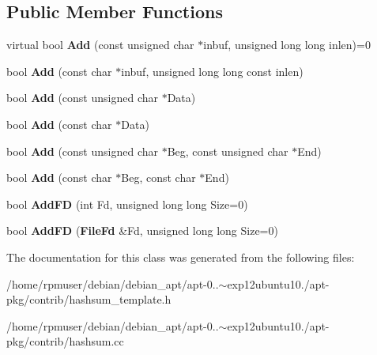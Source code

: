 \subsection*{\-Public \-Member \-Functions}
\begin{DoxyCompactItemize}
\item 
virtual bool {\bfseries \-Add} (const unsigned char $\ast$inbuf, unsigned long long inlen)=0\label{classSummationImplementation_ad941fe50a31f9b486cb6d359137875a4}

\item 
bool {\bfseries \-Add} (const char $\ast$inbuf, unsigned long long const inlen)\label{classSummationImplementation_ae98324caa9d98516e021fbb2eb4e575a}

\item 
bool {\bfseries \-Add} (const unsigned char $\ast$\-Data)\label{classSummationImplementation_a63a2347fc166a6a1c9c0b4a0bb902412}

\item 
bool {\bfseries \-Add} (const char $\ast$\-Data)\label{classSummationImplementation_a1e4b5c70e06447e00192b0dff87d140e}

\item 
bool {\bfseries \-Add} (const unsigned char $\ast$\-Beg, const unsigned char $\ast$\-End)\label{classSummationImplementation_a44d261f1d8091538cddf01568be612a7}

\item 
bool {\bfseries \-Add} (const char $\ast$\-Beg, const char $\ast$\-End)\label{classSummationImplementation_a8def83275c19358de0384f77a88de6c3}

\item 
bool {\bfseries \-Add\-F\-D} (int \-Fd, unsigned long long \-Size=0)\label{classSummationImplementation_a3b6e2493aad0ecf039aec72951323715}

\item 
bool {\bfseries \-Add\-F\-D} ({\bf \-File\-Fd} \&\-Fd, unsigned long long \-Size=0)\label{classSummationImplementation_a0d9064bf552f940c29d1ebda2468accb}

\end{DoxyCompactItemize}


\-The documentation for this class was generated from the following files\-:\begin{DoxyCompactItemize}
\item 
/home/rpmuser/debian/debian\-\_\-apt/apt-\/0..$\sim$exp12ubuntu10./apt-\/pkg/contrib/hashsum\-\_\-template.\-h\item 
/home/rpmuser/debian/debian\-\_\-apt/apt-\/0..$\sim$exp12ubuntu10./apt-\/pkg/contrib/hashsum.\-cc\end{DoxyCompactItemize}
